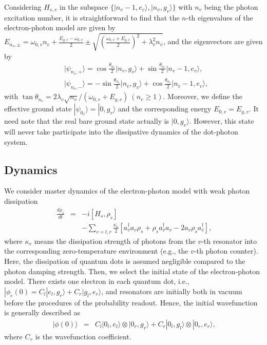 \documentclass[twocolumn,showpacs,preprintnumbers,amsmath,amssymb]{revtex4}
\begin{document}
	Considering $H_{s,v}$
	in the subspace $\{|n_v-1,e_{v}{\rangle},|n_v,g_{v}{\rangle}\}$
	with $n_v$ being the photon excitation number,
	it is straightforward to find that the $n$-th eigenvalues of the electron-photon model are given by
	$E_{n_v,\pm}=\omega_{0,v}n_v+\frac{E_{g,v}-\omega_{0,v}}{2}\pm\sqrt{(\frac{\omega_{0,v}+E_{g,v}}{2})^2+\lambda^2_vn_v}$,
	and the eigenvectors are given by
	\begin{subequations}
		\begin{align}
			&	\vert \psi_{n_v,+}\rangle =\cos{\frac{\theta_{n_v}}{2}}\vert n_v,g_{v}\rangle +\sin{\frac{\theta_{n_v}}{2}}\vert n_v-1,e_{v}\rangle, \\
			&  \vert \psi_{n_v,-}\rangle =-\sin{\frac{\theta_{n_v}}{2}}\vert n_v,g_{v}\rangle +\cos{\frac{\theta_{n_v}}{2}}\vert n_v-1,e_{v}\rangle ,
		\end{align}
	\end{subequations}
	with $\tan\theta_{n_v}=2\lambda_v\sqrt{n_v}/(\omega_{0,v}+E_{g,v})~(n_v{\ge}1)$.
	Moreover, we define the effective ground state
	$|\psi_{0_v}{\rangle}=|0,g_{v}{\rangle}$
	and the corresponding energy $E_{0,v}=E_{g,v}$.
	It need note that the real bare ground state actually is $|0, g_v{\rangle}$. However, this state will never take participate
	into the dissipative dynamics of the dot-photon system.
	
	\subsection{Dynamics}
	We consider master dynamics of the electron-photon  model with
	weak photon dissipation~\cite{uweiss2012book,hpb2002book,pstegman2022acs}
	\begin{eqnarray}~\label{lindblad}
		\frac{d \rho_s}{dt}&=&-i[H_s,\rho_s]\\
		&& -\sum_{v={l},{r}}\frac{\kappa_v}{2}[a^\dagger_v a_v \rho_s +\rho_s a^\dagger_v a_v -2a_v\rho_s a^\dagger_v],\nonumber
	\end{eqnarray}
	where $\kappa_v$ means the dissipation strength of  photons from the $v$-th resonator into the corresponding zero-temperature environment (e.g., the $v$-th photon counter).
	   Here, the dissipation of quantum dots is assumed negligible compared to the photon damping strength.
	Then, we select the initial state of the electron-photon model.
	There exists one electron in each quantum dot,
	i.e.,
	$|\phi_{e}(0)=C_{l}|e_{{l}},g_{{r}}{\rangle}
	+C_{r}|g_{{l}},e_{{r}}{\rangle}$,
	and resonators are initially both in vacuum before the procedures of the probability readout.
	Hence, the initial wavefunction is generally described as
	\begin{eqnarray}~\label{is1}
		|\phi(0){\rangle}&=&C_{l}|0_{l},e_{{l}}{\rangle}{\otimes}
		|0_{r},g_{{r}}{\rangle}
		+C_{r}|0_{l},g_{{l}}{\rangle}{\otimes}|0_{r},e_{{r}}{\rangle},
	\end{eqnarray}
	where $C_v$ is the wavefunction coefficient.
\end{document}
